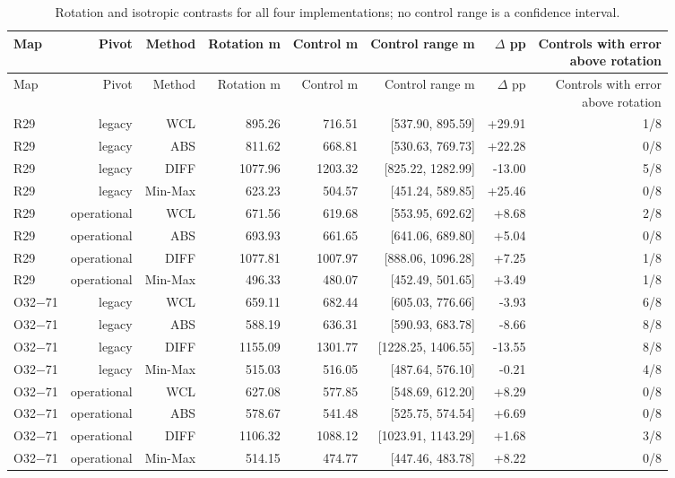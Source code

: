 \documentclass[journal,onecolumn,10pt]{IEEEtran}
\begin{document}
\begin{longtable}{@{}lrrrrrrr@{}}
\caption{Rotation and isotropic contrasts for all four implementations; no control range is a confidence interval.}\label{tab:s-all-rotation}\\
\toprule
Map & Pivot & Method & Rotation m & Control m & Control range m & $\Delta$ pp & \shortstack{Controls with error\\above rotation} \\
\midrule\endfirsthead
\toprule
Map & Pivot & Method & Rotation m & Control m & Control range m & $\Delta$ pp & \shortstack{Controls with error\\above rotation} \\
\midrule\endhead
\bottomrule\endfoot
R29 & legacy & WCL & 895.26 & 716.51 & [537.90, 895.59] & +29.91 & 1/8 \\
R29 & legacy & ABS & 811.62 & 668.81 & [530.63, 769.73] & +22.28 & 0/8 \\
R29 & legacy & DIFF & 1077.96 & 1203.32 & [825.22, 1282.99] & -13.00 & 5/8 \\
R29 & legacy & Min-Max & 623.23 & 504.57 & [451.24, 589.85] & +25.46 & 0/8 \\
R29 & operational & WCL & 671.56 & 619.68 & [553.95, 692.62] & +8.68 & 2/8 \\
R29 & operational & ABS & 693.93 & 661.65 & [641.06, 689.80] & +5.04 & 0/8 \\
R29 & operational & DIFF & 1077.81 & 1007.97 & [888.06, 1096.28] & +7.25 & 1/8 \\
R29 & operational & Min-Max & 496.33 & 480.07 & [452.49, 501.65] & +3.49 & 1/8 \\
O32$-$71 & legacy & WCL & 659.11 & 682.44 & [605.03, 776.66] & -3.93 & 6/8 \\
O32$-$71 & legacy & ABS & 588.19 & 636.31 & [590.93, 683.78] & -8.66 & 8/8 \\
O32$-$71 & legacy & DIFF & 1155.09 & 1301.77 & [1228.25, 1406.55] & -13.55 & 8/8 \\
O32$-$71 & legacy & Min-Max & 515.03 & 516.05 & [487.64, 576.10] & -0.21 & 4/8 \\
O32$-$71 & operational & WCL & 627.08 & 577.85 & [548.69, 612.20] & +8.29 & 0/8 \\
O32$-$71 & operational & ABS & 578.67 & 541.48 & [525.75, 574.54] & +6.69 & 0/8 \\
O32$-$71 & operational & DIFF & 1106.32 & 1088.12 & [1023.91, 1143.29] & +1.68 & 3/8 \\
O32$-$71 & operational & Min-Max & 514.15 & 474.77 & [447.46, 483.78] & +8.22 & 0/8 \\
\end{longtable}
\endgroup
\end{document}
